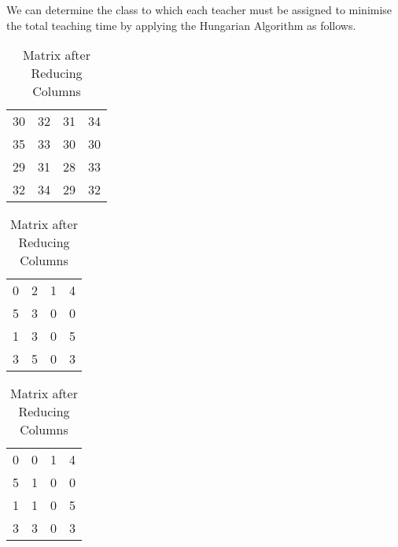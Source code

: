 % 
%
%

\begin{subquestions}
	
\subquestion
	
\begin{subsubquestions}
		
\subsubquestion
		
We can determine the class to which each teacher must be assigned to minimise the total teaching time by applying the Hungarian Algorithm as follows.
		\begin{table}[H]
			\begin{minipage}{0.3\textwidth}
				\centering
				\begin{tabular}{cccc}
					30 & 32 & 31 & 34 \\
					35 & 33 & 30 & 30 \\
					29 & 31 & 28 & 33 \\
					32 & 34 & 29 & 32 \\
				\end{tabular}
				\captionsetup{width=1.1\linewidth}
				\caption*{Matrix From question}
			\end{minipage}
			\hspace{20pt}
			\begin{minipage}{0.3\textwidth}
				\centering
				\begin{tabular}{cccc}
					0 & 2 & 1 & 4 \\
					5 & 3 & 0 & 0 \\
					1 & 3 & 0 & 5 \\
					3 & 5 & 0 & 3 \\
				\end{tabular}
				\captionsetup{width=1.1\linewidth}
				\caption*{Matrix after Reducing Rows}
			\end{minipage}
			\hspace{20pt}
			\begin{minipage}{0.3\textwidth}
				\centering
				\begin{tabular}{cccc}
					0 & 0 & 1 & 4 \\
					5 & 1 & 0 & 0 \\
					1 & 1 & 0 & 5 \\
					3 & 3 & 0 & 3 \\
				\end{tabular}
				\captionsetup{width=1.1\linewidth}
				\caption*{Matrix after Reducing Columns} 
			\end{minipage}
			

\end{table}
\end{subsubquestions}
\end{subquestions}
